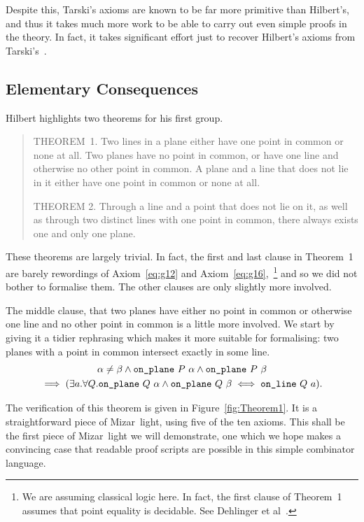 Despite this, Tarski's axioms are known to be far more primitive than Hilbert's, and thus it takes much more work to be able to carry out even simple proofs in the theory. In fact, it takes significant effort just to recover Hilbert's axioms from Tarski's~\cite{NarbouxTarskiHilbert}.

\subsection{Elementary Consequences}
Hilbert highlights two theorems for his first group.

\begin{quotation}
  THEOREM~1. Two lines in a plane either have one point in common or none at all. Two planes have no point in common, or have one line and otherwise no other point in common. A plane and a line that does not lie in it either have one point in common or none at all.

  THEOREM 2. Through a line and a point that does not lie on it, as well as through two distinct lines with one point in common, there always exists one and only one plane.
\end{quotation}

These theorems are largely trivial. In fact, the first and last clause in Theorem~1 are barely rewordings of Axiom~\ref{eq:g12} and Axiom~\ref{eq:g16},~\footnote{We are assuming classical logic here. In fact, the first clause of Theorem~1 assumes that point equality is decidable. See Dehlinger et al~\cite{DehlingerFOG}.} and so we did not bother to formalise them. The other clauses are only slightly more involved. 

The middle clause, that two planes have either no point in common or otherwise one line and no other point in common is a little more involved. We start by giving it a tidier rephrasing which makes it more suitable for formalising: two planes with a point in common intersect exactly in some line.
\begin{multline}
  \alpha \neq \beta \wedge \texttt{on\_plane}\ P\ \alpha \wedge \texttt{on\_plane}\ P\ \beta\\
  \implies (\exists a. \forall Q. \texttt{on\_plane}\ Q\ \alpha \wedge \texttt{on\_plane}\ Q\ \beta \iff \texttt{on\_line}\ Q\ a).
\end{multline}

The verification of this theorem is given in Figure~\ref{fig:Theorem1}. It is a straightforward piece of Mizar~light, using five of the ten axioms. This shall be the first piece of Mizar~light we will demonstrate, one which we hope makes a convincing case that readable proof scripts are possible in this simple combinator language.

